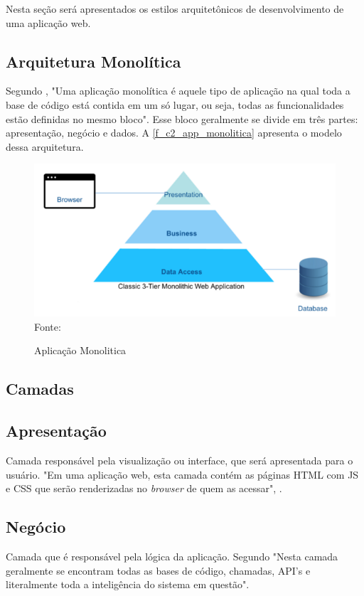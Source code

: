 Nesta seção será apresentados os estilos arquitetônicos de desenvolvimento de uma aplicação web.

\subsection{Arquitetura Monolítica}

Segundo \cite{monoVsMicro2017},  "Uma aplicação monolítica é aquele tipo de aplicação na qual toda a base de código está contida em um só lugar, ou seja, todas as funcionalidades estão definidas no mesmo bloco". Esse bloco geralmente se divide em três partes: apresentação, negócio e dados. A \autoref{f_c2_app_monolitica} apresenta o modelo dessa arquitetura.

\begin{figure}[h]
	\centering
	\caption{Aplicação Monolitica}
	\includegraphics[scale=0.7]{images/app-monolitica.png}\\
	Fonte:\cite{monoVsMicro2017}
 	\label{f_c2_app_monolitica}
\end{figure}

\newpage
\subsection*{Camadas}

\subsection*{Apresentação}
Camada responsável pela visualização ou interface, que será apresentada para o usuário. "Em uma aplicação web, esta camada contém as páginas \ac{HTML} com \ac{JS} e \ac{CSS} que serão renderizadas no \textit{browser} de quem as acessar",  \cite{monoVsMicro2017}.

\subsection*{Negócio}
Camada que é responsável pela lógica da aplicação. Segundo \cite{monoVsMicro2017} "Nesta camada geralmente se encontram todas as bases de código, chamadas, \ac{API}'s e literalmente toda a inteligência do sistema em questão".

